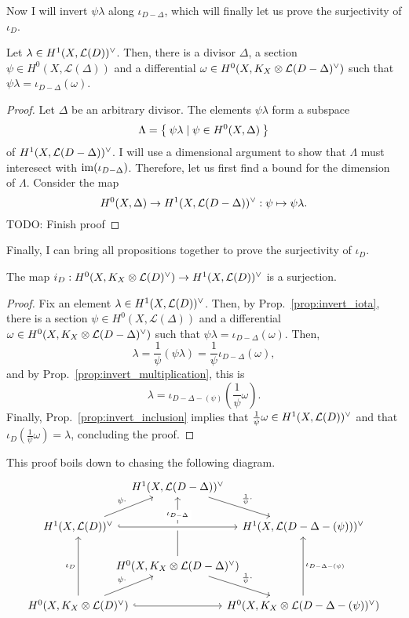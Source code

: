 Now I will invert $\psi\lambda$ along $\iota_{D-\Delta}$, which will finally
let us prove the surjectivity of $\iota_{D}$.
\begin{prop}\label{prop:invert_iota}
  Let $\lambda\in H^1(X,\mathcal{L}(D))^{\vee}$. Then, there is a divisor $\Delta$,
  a section $\psi\in H^{0}(X,\mathcal{L}(\Delta))$ and a differential
  $\omega\in H^0(X,K_X\otimes\mathcal{L}(D-\Delta)^{\vee})$ such that $\psi\lambda
  =\iota_{D-\Delta}(\omega)$.
\end{prop}
\begin{proof}
  Let $\Delta$ be an arbitrary divisor. The elements $\psi\lambda$ form a
  subspace
  \[
    \Lambda=\Set{\psi\lambda\mid\psi\in H^{0}(X,\Delta)}
  \]
  of $H^1(X,\mathcal{L}(D-\Delta))^{\vee}$. I will use a dimensional argument to show that
  $\Lambda$ must interesect with $\operatorname{im}(\iota_{D-\Delta})$. Therefore,
  let us first find a bound for the dimension of $\Lambda$. Consider the map
  \[H^{0}(X,\Delta)\to H^1(X,\mathcal{L}(D-\Delta))^{\vee}:\psi\mapsto\psi\lambda.\]
  TODO: Finish proof
\end{proof}

Finally, I can bring all propositions together to prove the surjectivity
of $\iota_{D}$.
\begin{prop}\label{prop:surjectivity}
  The map $i_{D}:H^0(X,K_X\otimes\mathcal{L}(D)^{\vee})\to H^1(X,\mathcal{L}(D))^{\vee}$ is a surjection.
\end{prop}
\begin{proof}
  Fix an element $\lambda\in H^1(X,\mathcal{L}(D))^{\vee}$. Then, by Prop.~\ref{prop:invert_iota},
  there is a section $\psi\in H^{0}(X,\mathcal{L}(\Delta))$ and a differential
  $\omega\in H^0(X,K_X\otimes\mathcal{L}(D-\Delta)^{\vee})$ such that $\psi\lambda=\iota_{D-\Delta}(\omega)$.
  Then,
  \[\lambda=\frac1{\psi}(\psi\lambda)=\frac1{\psi}\iota_{D-\Delta}(\omega),\]
  and by Prop.~\ref{prop:invert_multiplication}, this is
  \[\lambda=\iota_{D-\Delta-(\psi)}(\frac1{\psi}\omega).\]
  Finally, Prop.~\ref{prop:invert_inclusion} implies that
  $\frac1{\psi}\omega\in H^1(X,\mathcal{L}(D))^{\vee}$ and that $\iota_{D}(\frac1{\psi}\omega)
  =\lambda$, concluding the proof.
\end{proof}
\begin{cat}
  This proof boils down to chasing the following diagram.
  \[\begin{tikzcd}[column sep=-2em]
    & {\dual{D-\Delta}} \\
    {\dual{D}} && {\dual{D-\Delta-(\psi)}} \\
    & {\diffs{D-\Delta}} \\
    {\diffs{D}} && {\diffs{D-\Delta-(\psi)}}
    \arrow["\psi\cdot", from=2-1, to=1-2]
    \arrow["{\frac1{\psi}\cdot}", from=1-2, to=2-3]
    \arrow["\iota_D", from=4-1, to=2-1]
    \arrow["{\iota_{D-\Delta}}"{description, pos=0.7}, from=3-2, to=1-2]
    \arrow["\iota_{D-\Delta-(\psi)}"', from=4-3, to=2-3]
    \arrow[hook, crossing over, from=2-1, to=2-3]
    \arrow[hook, from=4-1, to=4-3]
    \arrow["\psi\cdot", from=4-1, to=3-2]
    \arrow["{\frac1{\psi}\cdot}", from=3-2, to=4-3]
  \end{tikzcd}\]
\end{cat}

